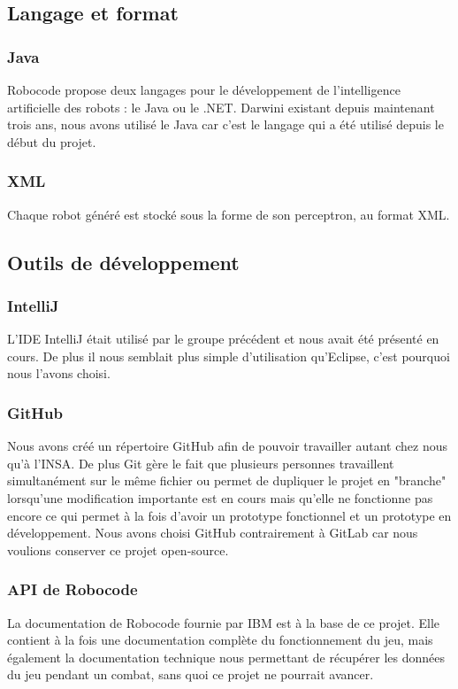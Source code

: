 \documentclass[12pt]{article}
\begin{document}
\subsection{Langage et format}

\subsubsection{Java}
Robocode propose deux langages pour le développement de l'intelligence artificielle des robots : le Java ou le .NET. Darwini existant depuis maintenant trois ans, nous avons utilisé le Java car c'est le langage qui a été utilisé depuis le début du projet.

\subsubsection{XML}
Chaque robot généré est stocké sous la forme de son perceptron, au format XML. 

\subsection{Outils de développement}

\subsubsection{IntelliJ}
L'IDE IntelliJ était utilisé par le groupe précédent et nous avait été présenté en cours. De plus il nous semblait plus simple d'utilisation qu'Eclipse, c'est pourquoi nous l'avons choisi.

\subsubsection{GitHub}
Nous avons créé un répertoire GitHub afin de pouvoir travailler autant chez nous qu'à l'INSA. De plus Git gère le fait que plusieurs personnes travaillent simultanément sur le même fichier ou permet de dupliquer le projet en "branche" lorsqu'une modification importante est en cours mais qu'elle ne fonctionne pas encore ce qui permet à la fois d'avoir un prototype fonctionnel et un prototype en développement. Nous avons choisi GitHub contrairement à GitLab car nous voulions conserver ce projet open-source.

\subsubsection{API de Robocode}
La documentation de Robocode fournie par IBM est à la base de ce projet. Elle contient à la fois une documentation complète du fonctionnement du jeu, mais également la documentation technique nous permettant de récupérer les données du jeu pendant un combat, sans quoi ce projet ne pourrait avancer.
\end{document}
